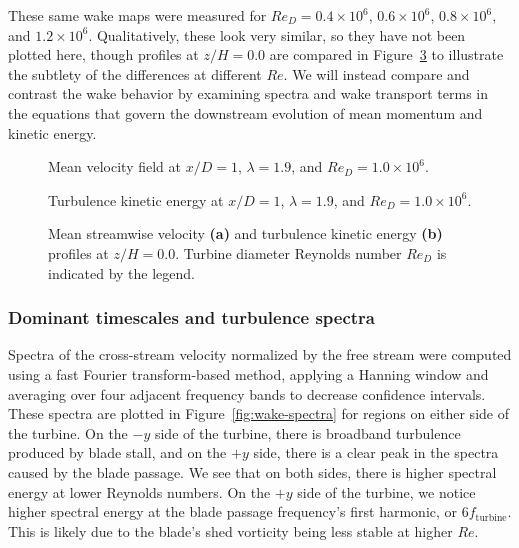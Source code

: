 These same wake maps were measured for $Re_D = 0.4 \times 10^6$, $0.6 \times
10^6$, $0.8 \times 10^6$, and $1.2 \times 10^6$. Qualitatively, these look very
similar, so they have not been plotted here, though profiles at $z/H=0.0$ are
compared in Figure~\ref{fig:profiles} to illustrate the subtlety of the
differences at different $Re$. We will instead compare and contrast the wake
behavior by examining spectra and wake transport terms in the equations that
govern the downstream evolution of mean momentum and kinetic energy.

\begin{figure}[ht]
\centering


\caption{Mean velocity field at $x/D=1$, $\lambda=1.9$, and $Re_D=1.0 \times
    10^6$.}

\label{fig:meancontquiv}
\end{figure}
\unskip

\begin{figure}[ht]
\centering


\caption{Turbulence kinetic energy at $x/D=1$, $\lambda=1.9$, and $Re_D=1.0
    \times 10^6$.}

\label{fig:kcont}
\end{figure}
\unskip

\begin{figure}[ht]
\centering


\caption{Mean streamwise velocity \textbf{(a)} and turbulence kinetic energy
    \textbf{(b)} profiles at $z/H=0.0$. Turbine diameter Reynolds number $Re_D$ is
    indicated by the legend.}

\label{fig:profiles}
\end{figure}


\subsubsection{Dominant timescales and turbulence spectra}

Spectra of the cross-stream velocity normalized by the free stream were computed
using a fast Fourier transform-based method, applying a Hanning window and
averaging over four adjacent frequency bands to decrease confidence intervals.
These spectra are plotted in Figure~\ref{fig:wake-spectra} for regions on either
side of the turbine. On the $-y$ side of the turbine, there is broadband
turbulence produced by blade stall, and on the $+y$ side, there is a clear peak
in the spectra caused by the blade passage. We see that on both sides, there is
higher spectral energy at lower Reynolds numbers. On the $+y$ side of the
turbine, we notice higher spectral energy at the blade passage frequency's first
harmonic, or $6 f_\mathrm{turbine}$. This is likely due to the blade's shed
vorticity being less stable at higher $Re$.

